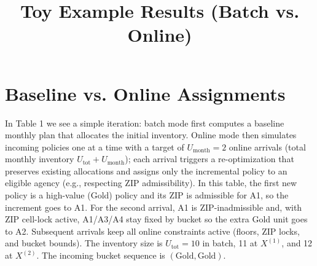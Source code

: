 \documentclass[11pt]{article}
\title{Toy Example Results (Batch vs. Online)}
\author{}
\date{}
\begin{document}
\maketitle

\section*{Baseline vs. Online Assignments}

\noindent
In Table 1 we see a simple iteration: batch mode first computes a baseline monthly plan
that allocates the initial inventory. Online mode then simulates incoming policies one
at a time with a target of $U_{\text{month}}=2$ online arrivals (total monthly inventory
$U_{\text{tot}}+U_{\text{month}}$); each arrival triggers a re-optimization
that preserves existing allocations and assigns only the incremental policy to an eligible
agency (e.g., respecting ZIP admissibility). In this table, the first new policy is a
high-value (Gold) policy and its ZIP is admissible for A1, so the increment goes to A1.
For the second arrival, A1 is ZIP-inadmissible and, with ZIP cell-lock active, A1/A3/A4
stay fixed by bucket so the extra Gold unit goes to A2. Subsequent arrivals keep
all online constraints active (floors, ZIP locks, and bucket bounds). The inventory size is
$U_{\text{tot}}=10$ in batch, 11 at $X^{(1)}$, and 12 at $X^{(2)}$.
The incoming bucket sequence is
$(\text{Gold},\text{Gold})$.
\end{document}
